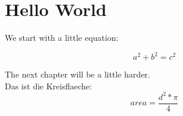 \documentclass[11pt]{article}
\begin{document}
\section{Hello World}

We start with a little equation:


\begin{equation}
	a^2 + b^2 = c^2
\end{equation}


The next chapter will be a little harder. 
\\

Das ist die Kreisflaeche:
\begin{equation}
	area = \frac{d^2 * \pi}{4}
\end{equation}
\end{document}
